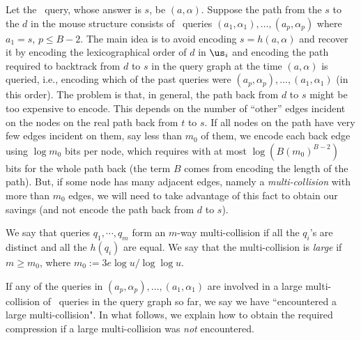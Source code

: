 Let  the \new\ query, whose answer is $s$, be $(a,\alpha)$. Suppose the path from the $s$ to the $d$ in the mouse structure consists of \urep\ queries $(a_1,\alpha_1),\ldots,(a_p,\alpha_p)$ where $a_1=s$, $p\leq B-2$.
%
The main idea is to avoid encoding $s=h(a,\alpha)$ and recover it by encoding the lexicographical order of $d$ in $\us_i$ and encoding the path required to backtrack from $d$ to $s$ in the query graph at the time $(a,\alpha)$ is queried, i.e., encoding which of the past queries were $(a_p,\alpha_p),\ldots,(a_1,\alpha_1)$ (in this order). 
The problem is that, in general, the path back from $d$ to $s$ might be too expensive to encode. This depends on the number of ``other'' edges incident on the nodes on the real path back from $t$ to $s$. If all nodes on the path have very few edges incident on them, say less than $m_0$ of them, we encode each back edge using $\log m_0$ bits per node, which requires with at most $\log (B (m_0)^{B-2})$ bits for the whole path back (the term $B$ comes from encoding the length of the path). But, if some node has many adjacent edges, namely a \emph{multi-collision} with more than $m_0$ edges, we will need to take advantage of this fact to obtain our savings (and not encode the path back from $d$ to $s$).

\begin{definition}
We say that queries $q_1,\cdots,q_m$ form an $m$-way multi-collision if all the $q_i$'s are distinct and all the $h(q_i)$ are equal. %
We say that the multi-collision is \emph{large} if $m\geq m_0$, where $m_0:=3e\log u/ \log \log u $. %
\end{definition}
If any of the queries in $(a_p,\alpha_p),\ldots,(a_1,\alpha_1)$ are involved in a large multi-collision of \urep\ queries in the query graph so far, we say we have ``encountered a large multi-collision". In what follows, we explain how to obtain the required compression if a large multi-collision was \emph{not} encountered.


